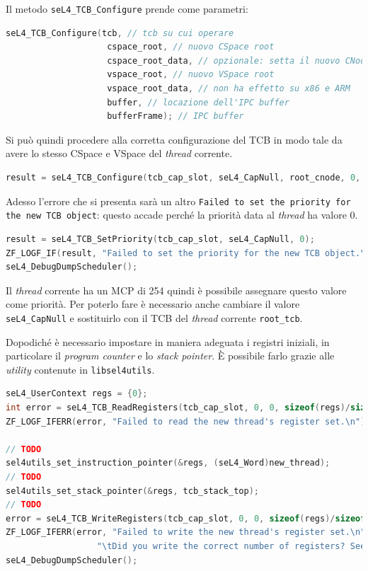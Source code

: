 Il metodo \texttt{seL4\_TCB\_Configure} prende come parametri:
\begin{lstlisting}[language=C++]
seL4_TCB_Configure(tcb, // tcb su cui operare
					cspace_root, // nuovo CSpace root
					cspace_root_data, // opzionale: setta il nuovo CNode
					vspace_root, // nuovo VSpace root
					vspace_root_data, // non ha effetto su x86 e ARM
					buffer, // locazione dell'IPC buffer
					bufferFrame); // IPC buffer
\end{lstlisting} 

Si può quindi procedere alla corretta configurazione del TCB in modo tale da avere lo stesso CSpace e VSpace del \textit{thread} corrente.
\begin{lstlisting}[language=C++]
result = seL4_TCB_Configure(tcb_cap_slot, seL4_CapNull, root_cnode, 0, root_vspace, 0, (seL4_Word) thread_ipc_buff_sym, tcb_ipc_frame);
\end{lstlisting}

Adesso l'errore che si presenta sarà un altro
\texttt{Failed to set the priority for the new TCB object}: questo accade perché la priorità data al \textit{thread} ha valore 0.
\begin{lstlisting}[language=C++]
result = seL4_TCB_SetPriority(tcb_cap_slot, seL4_CapNull, 0);
ZF_LOGF_IF(result, "Failed to set the priority for the new TCB object.\n");
seL4_DebugDumpScheduler();
\end{lstlisting}

Il \textit{thread} corrente ha un MCP di 254 quindi è possibile assegnare questo valore come priorità. Per poterlo fare è necessario anche cambiare il valore \texttt{seL4\_CapNull} e sostituirlo con il TCB del \textit{thread} corrente \texttt{root\_tcb}.

Dopodiché è necessario impostare in maniera adeguata i registri iniziali, in particolare il \textit{program counter} e lo \textit{stack pointer}. È possibile farlo grazie alle \textit{utility} contenute in \texttt{libsel4utils}.
\begin{lstlisting}[language=C++]
seL4_UserContext regs = {0};
int error = seL4_TCB_ReadRegisters(tcb_cap_slot, 0, 0, sizeof(regs)/sizeof(seL4_Word), &regs);
ZF_LOGF_IFERR(error, "Failed to read the new thread's register set.\n");

// TODO
sel4utils_set_instruction_pointer(&regs, (seL4_Word)new_thread);
// TODO
sel4utils_set_stack_pointer(&regs, tcb_stack_top);
// TODO
error = seL4_TCB_WriteRegisters(tcb_cap_slot, 0, 0, sizeof(regs)/sizeof(seL4_Word), &regs);
ZF_LOGF_IFERR(error, "Failed to write the new thread's register set.\n"
                  "\tDid you write the correct number of registers? See arg4.\n");
seL4_DebugDumpScheduler();
\end{lstlisting}

